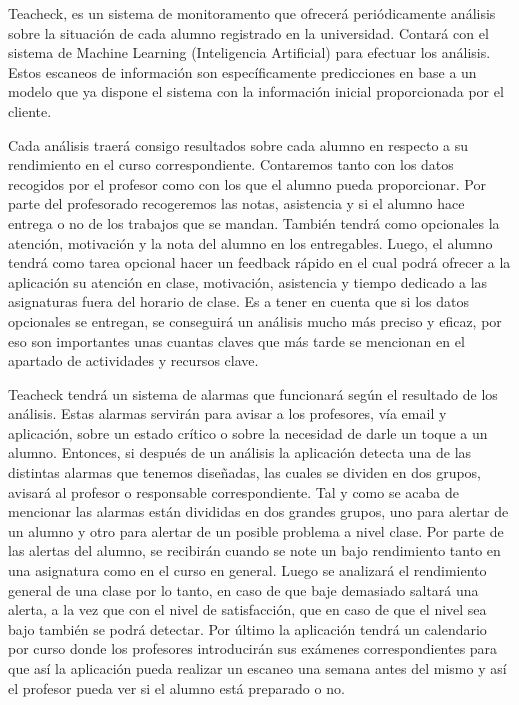 Teacheck, es un sistema de monitoramento que ofrecerá periódicamente análisis sobre la situación de cada alumno registrado en la universidad. Contará con el sistema de Machine Learning (Inteligencia Artificial)  para efectuar los análisis. Estos escaneos de información son específicamente predicciones en base a un modelo que ya dispone el sistema con la información inicial proporcionada por el cliente.

Cada análisis traerá consigo resultados sobre cada alumno en respecto a su rendimiento en el curso correspondiente. Contaremos tanto con los datos recogidos por el profesor como con los que el alumno pueda proporcionar. Por parte del profesorado recogeremos las notas, asistencia y si el alumno hace entrega o no de los trabajos que se mandan. También tendrá como opcionales la atención, motivación y la nota del alumno en los entregables. Luego, el alumno tendrá como tarea opcional hacer un feedback rápido en el cual podrá ofrecer a la aplicación su atención en clase, motivación, asistencia y tiempo dedicado a las asignaturas fuera del horario de clase. Es a tener en cuenta que si los datos opcionales se entregan, se conseguirá un análisis mucho más preciso y eficaz, por eso son importantes unas cuantas claves que más tarde se mencionan en el apartado de actividades y recursos clave.

Teacheck tendrá un sistema de alarmas que funcionará según el resultado de los análisis. Estas alarmas servirán para avisar a los profesores, vía email y aplicación, sobre un estado crítico o sobre la necesidad de darle un toque a un alumno. Entonces, si después de un análisis la aplicación detecta una de las distintas alarmas que tenemos diseñadas, las cuales se dividen en dos grupos, avisará al profesor o responsable correspondiente. Tal y como se acaba de mencionar las alarmas están divididas en dos grandes grupos, uno para alertar de un alumno y otro para alertar de un posible problema a nivel clase. Por parte de las alertas del alumno, se recibirán cuando se note un bajo rendimiento tanto en una asignatura como en el curso en general. Luego se analizará el rendimiento general de una clase por lo tanto, en caso de que baje demasiado saltará una alerta, a la vez que con el nivel de satisfacción, que en caso de que el nivel sea bajo también se podrá detectar. Por último la aplicación tendrá un calendario por curso donde los profesores introducirán sus exámenes correspondientes para que así la aplicación pueda realizar un escaneo una semana antes del mismo y así el profesor pueda ver si el alumno está preparado o no.

